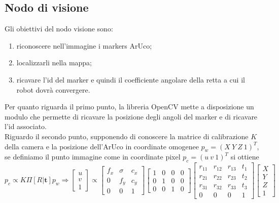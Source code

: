 \label{sec:impl}
\subsection{Nodo di visione}
Gli obiettivi del nodo visione sono:
\begin{enumerate}
  \item riconoscere nell'immagine i markers ArUco;
  \item localizzarli nella mappa;
  \item ricavare l'id del marker e quindi il coefficiente angolare della retta a cui il robot dovrà convergere.
\end{enumerate}
  Per quanto riguarda il primo punto, la libreria OpenCV \cite{opencv_library} mette a disposizione un modulo che permette di ricavare la posizione degli angoli del 
  marker e di ricavare l'id associato. \\
  Riguardo il secondo punto, supponendo di conoscere la matrice di calibrazione $K$ della camera \cite{multiple_view} e la posizione dell'ArUco in coordinate omogenee 
  $p_w = (X \: Y \: Z \: 1 )^T$, se definiamo il punto immagine come in coordinate pixel $ p_c =  (u \: v \: 1)^T$ si ottiene 
    \begin{equation}
    p_c \propto K \Pi [R | \boldsymbol{t}] p_w  \Rightarrow
     \begin{bmatrix}
           u \\
           v \\
           1
        \end{bmatrix}
         \propto 
         \begin{bmatrix}
           f_x & \sigma & c_x \\
           0 & f_y & c_y \\
           0 & 0 & 1 
         \end{bmatrix}
          \begin{bmatrix}
           1 & 0 & 0 & 0 \\
           0 & 1 & 0 & 0 \\
           0 & 0 & 1 & 0
         \end{bmatrix}
         \begin{bmatrix}
           r_{11} & r_{12} & r_{13} & t_1 \\
           r_{21} & r_{22} & r_{23} & t_2 \\
           r_{31} & r_{32} & r_{33} & t_3  \\
           0 & 0 & 0 & 1
         \end{bmatrix}
         \begin{bmatrix}
           X \\
           Y \\
           Z \\
           1
    \end{bmatrix}
  \end{equation}
